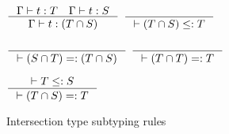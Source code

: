 \documentclass[acmsmall,nonacm]{acmart}\settopmatter{printfolios=true,printccs=false,printacmref=false}
\begin{document}
\begin{minipage}{0.5\textwidth}
\begin{figure}[H]
  \centering
\vspace*{5mm}
$\inference {\Gamma |- t : T \quad \Gamma |- t : S}{\Gamma |- t : (T \cap S)}$\hspace*{2mm}
$\inference {}{|- (T \cap S) \leq: T}$\par
\vspace*{4mm}
$\inference {}{|- (S \cap T) =: (T \cap S)}$\hspace*{2mm}
$\inference {}{|- (T \cap T) =: T}$\par
\vspace*{4mm}
$\inference {|- T \leq: S}{|- (T \cap S) =: T}$
\caption*{Intersection type subtyping rules}
\end{figure}
\end{minipage}
\end{document}
